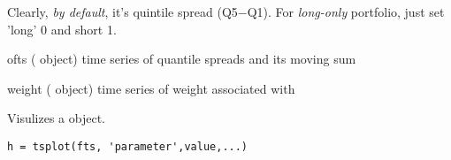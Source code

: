 \begin{argdesc}
      Clearly, \emph{by default}, it's quintile spread (Q5$-$Q1).
      For \emph{long-only} portfolio, just set 'long' 0 and short 1. 
	\end{argdesc}

\outarg
   \begin{argdesc}	
	   \item[ofts] (\myfints{} object)  time series of quantile spreads and its moving sum
	   \item[weight] (\myfints{} object) time series of weight associated with 
   \end{argdesc}


Visulizes a \myfints{} object.

\usage
   \begin{lstlisting}[numbers=none]
   h = tsplot(fts, 'parameter',value,...)
   \end{lstlisting}

